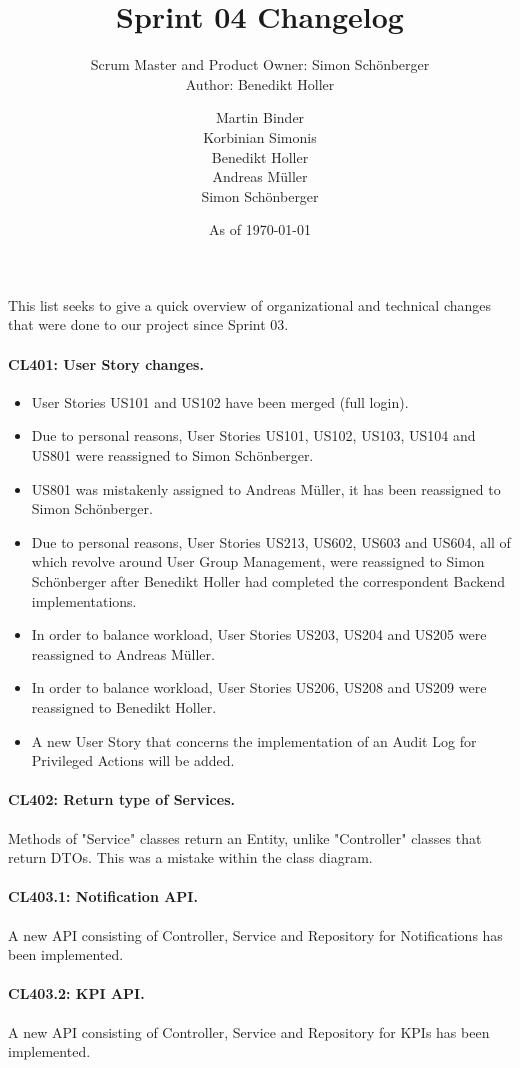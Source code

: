 \documentclass{scrreprt}
\title{Sprint 04 Changelog}
\subtitle{Scrum Master and Product Owner: Simon Sch\"onberger \\ Author: Benedikt Holler}
\author{Martin Binder\\Korbinian Simonis\\Benedikt Holler\\Andreas M\"uller\\Simon Sch\"onberger}
\date{As of \today}
\begin{document}
\maketitle
This list seeks to give a quick overview of organizational and technical changes that were done to our project since Sprint 03.

\paragraph{CL401: User Story changes.} 
\begin{itemize} 
	\item User Stories US101 and US102 have been merged (full login).
	\item Due to personal reasons, User Stories US101, US102, US103, US104 and US801 were reassigned to Simon Sch\"onberger.
	\item US801 was mistakenly assigned to Andreas M\"uller, it has been reassigned to Simon Sch\"onberger.
	\item Due to personal reasons, User Stories US213, US602, US603 and US604, all of which revolve around User Group Management, were reassigned to Simon Sch\"onberger after Benedikt Holler had completed the correspondent Backend implementations.
	\item In order to balance workload, User Stories US203, US204 and US205 were reassigned to Andreas M\"uller.
	\item In order to balance workload, User Stories US206, US208 and US209 were reassigned to Benedikt Holler.
	\item A new User Story that concerns the implementation of an Audit Log for Privileged Actions will be added.
\end{itemize}
\paragraph{CL402: Return type of Services.} Methods of "Service" classes return an Entity, unlike "Controller" classes that return DTOs. This was a mistake within the class diagram.
\paragraph{CL403.1: Notification API.} A new API consisting of Controller, Service and Repository for Notifications has been implemented.
\paragraph{CL403.2: KPI API.} A new API consisting of Controller, Service and Repository for KPIs has been implemented.
\end{document}
